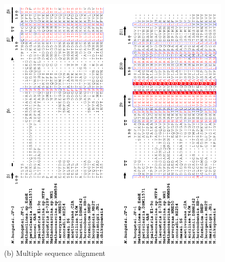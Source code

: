 \documentclass[fontsize=12pt,headsepline=true, bibliography=totocnumbered, twoside]{scrbook} %
\begin{document}
\begin{figure}
\ContinuedFloat
\includegraphics[scale=1.13]{alignment2}
\caption[Multiple sequence alignment (b)]{(b) Multiple sequence alignment}
\end{figure}
\end{document}
